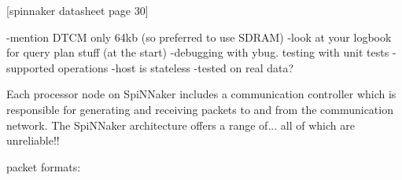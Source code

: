 [spinnaker datasheet page 30]

-mention DTCM only 64kb (so preferred to use SDRAM)
-look at your logbook for query plan stuff (at the start)
-debugging with ybug. testing with unit tests
-supported operations
-host is stateless
-tested on real data?

Each processor node on SpiNNaker includes a communication controller which is responsible for generating and receiving packets to and from the communication network.
The SpiNNaker architecture offers a range of...
all of which are unreliable!!

packet formats:


